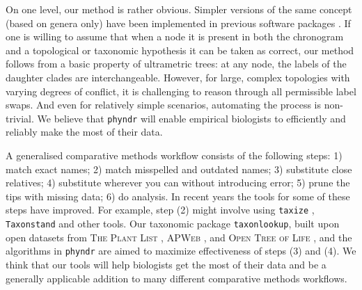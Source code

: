 \documentclass[a4paper,11pt]{article}
\newcommand{\phyndr}{\tt phyndr}
\newcommand{\taxonlookup}{\tt taxonlookup}
\begin{document}
On one level, our method is rather obvious. Simpler versions of the same concept (based on genera only) have been implemented in previous software packages \citep[e.g., \texttt{phyloGenerator};][]{pearse2013phylogenerator}.  If one is willing to assume that when a node it is present in both the chronogram and a topological or taxonomic hypothesis it can be taken as correct, our method follows from a basic property of ultrametric trees: at any node, the labels of the daughter clades are interchangeable. However, for large, complex topologies with varying degrees of conflict, it is challenging to reason through all permissible label swaps. And even for relatively simple scenarios, automating the process is non-trivial. We believe that {\phyndr} will enable empirical biologists to efficiently and reliably make the most of their data.

A generalised comparative methods workflow consists of the following steps:  1) match exact names; 2) match misspelled and outdated names; 3) substitute close relatives; 4) substitute wherever you can without introducing error; 5) prune the tips with missing data; 6) do analysis.  In recent years the tools for some of these steps have improved.  For example, step (2) might involve using \texttt{taxize} \citep{taxize}, \texttt{Taxonstand} \citep{cayuela2012} and other tools.
%
%
Our taxonomic package {\taxonlookup}, built upon open datasets from \textsc{The Plant List} \citep{ThePlantList}, \textsc{APWeb} \citep{apweb}, and \textsc{Open Tree of Life} \citep{OpenTree}, and the algorithms in {\phyndr} are aimed to maximize effectiveness of steps (3) and (4). We think that our tools will help biologists get the most of their data and be a generally applicable addition to many different comparative methods workflows.
\end{document}
